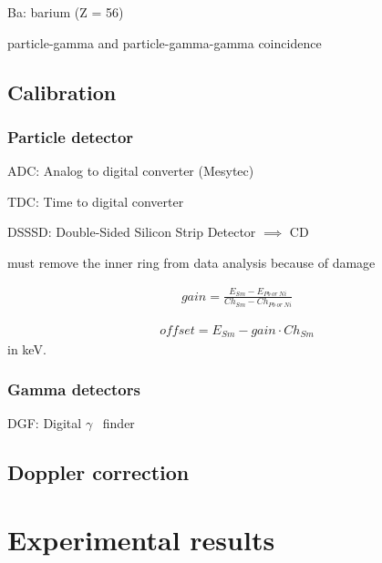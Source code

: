 \documentclass[twoside,english]{uiofysmaster/uiofysmaster}
\newcommand{\ga}{$\gamma$}
\begin{document}
Ba: barium (Z = 56)


\bigskip

particle-gamma and particle-gamma-gamma coincidence

\section{Calibration}
\subsection{Particle detector}
ADC: Analog to digital converter (Mesytec)

TDC: Time to digital converter

DSSSD: Double-Sided Silicon Strip Detector $\implies$ CD

must remove the inner ring from data analysis because of damage

\begin{align*}
	gain = \frac{E_{Sm} - E_{Pb ~or~ Ni}}{Ch_{Sm} - Ch_{Pb ~or~ Ni}}
\end{align*}

\begin{align*}
	offset = E_{Sm} - gain \cdot Ch_{Sm}
\end{align*}
in keV.



\subsection{Gamma detectors}

DGF: Digital \ga~ finder

\section{Doppler correction}



\chapter{Experimental results}


\end{document}
